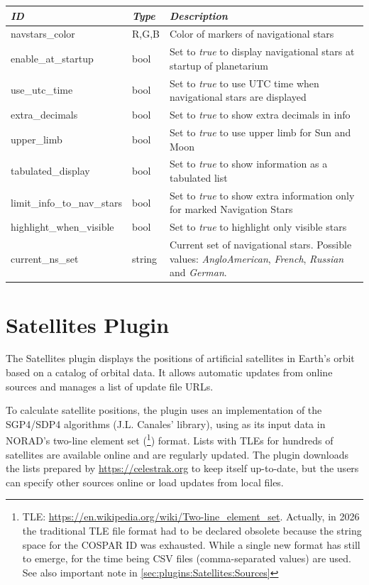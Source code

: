 \noindent%
\begin{tabularx}{\textwidth}{l|l|X}\toprule
\emph{ID}              & \emph{Type} & \emph{Description}\\\midrule
navstars\_color             & R,G,B  & Color of markers of navigational stars  \\
enable\_at\_startup         & bool   & Set to \emph{true} to display navigational stars at startup of planetarium  \\
use\_utc\_time              & bool   & Set to \emph{true} to use UTC time when navigational stars are displayed \\
extra\_decimals             & bool   & Set to \emph{true} to show extra decimals in info \\
upper\_limb                 & bool   & Set to \emph{true} to use upper limb for Sun and Moon \\
tabulated\_display          & bool   & Set to \emph{true} to show information as a tabulated list \\
limit\_info\_to\_nav\_stars & bool   & Set to \emph{true} to show extra information only for marked Navigation Stars \\ 
highlight\_when\_visible    & bool   & Set to \emph{true} to highlight only visible stars \\
current\_ns\_set            & string & Current set of navigational stars. Possible values: \emph{AngloAmerican}, \emph{French}, \emph{Russian} and \emph{German}. \\
\bottomrule
\end{tabularx}


\newpage
\section{Satellites Plugin}
\label{sec:plugins:Satellites}


\noindent The Satellites plugin displays the positions of artificial satellites in Earth's orbit based on a catalog of orbital data. It allows
automatic updates from online sources and manages a list of update
file URLs.

To calculate satellite positions, the plugin uses an implementation of
the SGP4/SDP4 algorithms (J.L. Canales'  library), using
as its input data in NORAD's two-line element set
(\footnote{TLE: \url{https://en.wikipedia.org/wiki/Two-line_element_set}. 
Actually, in 2026 the traditional TLE file format had to be declared obsolete because the string space for the COSPAR ID was exhausted. 
While a single new format has still to emerge, for the time being CSV files (comma-separated values) are used. 
See also important note in \ref{sec:plugins:Satellites:Sources}})
format. Lists with TLEs for hundreds of satellites are available
online and are regularly updated. The plugin downloads the lists
prepared by \url{https://celestrak.org} to keep itself up-to-date, but the users can
specify other sources online or load updates from local files.

